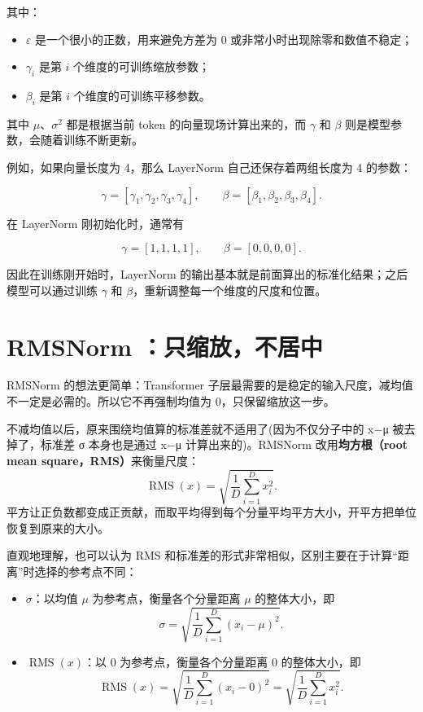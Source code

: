 \documentclass[UTF8,11pt,a4paper]{ctexart}
\begin{document}
其中：

\begin{itemize}[leftmargin=2em]
    \item $\varepsilon$ 是一个很小的正数，用来避免方差为 0 或非常小时出现除零和数值不稳定；
    \item $\gamma_i$ 是第 $i$ 个维度的可训练缩放参数；
    \item $\beta_i$ 是第 $i$ 个维度的可训练平移参数。
\end{itemize}

其中 $\mu$、$\sigma^2$ 都是根据当前 token 的向量现场计算出来的，而 $\gamma$ 和 $\beta$ 则是模型参数，会随着训练不断更新。

例如，如果向量长度为 4，那么 LayerNorm 自己还保存着两组长度为 4 的参数：

\[
\gamma=[\gamma_1,\gamma_2,\gamma_3,\gamma_4],
\qquad
\beta=[\beta_1,\beta_2,\beta_3,\beta_4].
\]

在 LayerNorm 刚初始化时，通常有

\[
\gamma=[1,1,1,1],
\qquad
\beta=[0,0,0,0].
\]

因此在训练刚开始时，LayerNorm 的输出基本就是前面算出的标准化结果；之后模型可以通过训练 $\gamma$ 和 $\beta$，重新调整每一个维度的尺度和位置。
\section{RMSNorm ：只缩放，不居中}

RMSNorm 的想法更简单：Transformer 子层最需要的是稳定的输入尺度，减均值不一定是必需的。所以它不再强制均值为 0，只保留缩放这一步。

不减均值以后，原来围绕均值算的标准差就不适用了(因为不仅分子中的 x−μ 被去掉了，标准差 σ 本身也是通过 x−μ 计算出来的)。RMSNorm 改用\textbf{均方根（root mean square，RMS）}来衡量尺度：
\[
\operatorname{RMS}(x)
=\sqrt{\frac{1}{D}\sum_{i=1}^{D}x_i^2}.
\]
平方让正负数都变成正贡献，而取平均得到每个分量平均平方大小，开平方把单位恢复到原来的大小。

直观地理解，也可以认为 RMS 和标准差的形式非常相似，区别主要在于计算“距离”时选择的参考点不同：

\begin{itemize}[leftmargin=2em]
    \item $\sigma$：以均值 $\mu$ 为参考点，衡量各个分量距离 $\mu$ 的整体大小，即
    \[
    \sigma
    =
    \sqrt{\frac{1}{D}\sum_{i=1}^{D}(x_i-\mu)^2}.
    \]

    \item $\operatorname{RMS}(x)$：以 $0$ 为参考点，衡量各个分量距离 $0$ 的整体大小，即
    \[
    \operatorname{RMS}(x)
    =
    \sqrt{\frac{1}{D}\sum_{i=1}^{D}(x_i-0)^2}
    =
    \sqrt{\frac{1}{D}\sum_{i=1}^{D}x_i^2}.
    \]
\end{itemize}
\end{document}

